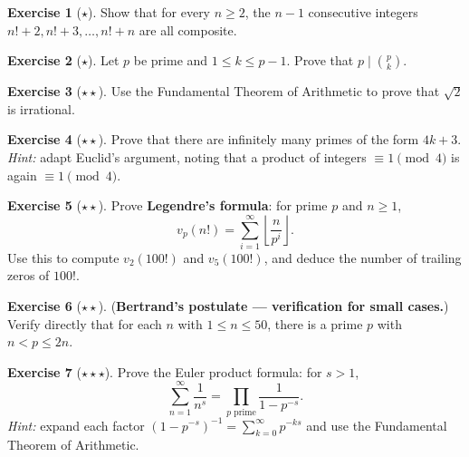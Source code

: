 \documentclass[12pt,a4paper,openany]{book}
\theoremstyle{definition}
\newtheorem{exercise}{Exercise}[chapter]
\theoremstyle{plain}
\theoremstyle{remark}
\newcommand{\floor}[1]{\left\lfloor #1 \right\rfloor}
\begin{document}
\begin{exercise}[$\star$]
\label{exer:ch2-composite-consecutive}
Show that for every $n \ge 2$, the $n-1$ consecutive integers
$n! + 2, n! + 3, \ldots, n! + n$ are all composite.
\end{exercise}

\begin{exercise}[$\star$]
\label{exer:ch2-p-divides-binom}
Let $p$ be prime and $1 \le k \le p-1$. Prove that $p \mid \binom{p}{k}$.
\end{exercise}

\begin{exercise}[$\star\star$]
\label{exer:ch2-sqrt2-irrational}
Use the Fundamental Theorem of Arithmetic to prove that $\sqrt{2}$ is
irrational.
\end{exercise}

\begin{exercise}[$\star\star$]
\label{exer:ch2-primes-4k3}
Prove that there are infinitely many primes of the form $4k + 3$.
\textit{Hint:} adapt Euclid's argument, noting that a product of integers
$\equiv 1 \pmod{4}$ is again $\equiv 1 \pmod{4}$.
\end{exercise}

\begin{exercise}[$\star\star$]
\label{exer:ch2-legendre-formula}
Prove \textbf{Legendre's formula}: for prime $p$ and $n \ge 1$,
\[
  v_p(n!) = \sum_{i=1}^{\infty} \floor{\frac{n}{p^i}}.
\]
Use this to compute $v_2(100!)$ and $v_5(100!)$, and deduce the number of
trailing zeros of $100!$.
\end{exercise}

\begin{exercise}[$\star\star$]
\label{exer:ch2-bertrand}
(\textbf{Bertrand's postulate --- verification for small cases.})
Verify directly that for each $n$ with $1 \le n \le 50$, there is a prime $p$
with $n < p \le 2n$.
\end{exercise}

\begin{exercise}[$\star\star\star$]
\label{exer:ch2-euler-product}
Prove the Euler product formula: for $s > 1$,
\[
  \sum_{n=1}^{\infty} \frac{1}{n^s}
  = \prod_{p \text{ prime}} \frac{1}{1 - p^{-s}}.
\]
\textit{Hint:} expand each factor $(1-p^{-s})^{-1} = \sum_{k=0}^{\infty}p^{-ks}$
and use the Fundamental Theorem of Arithmetic.
\end{exercise}
\end{document}
